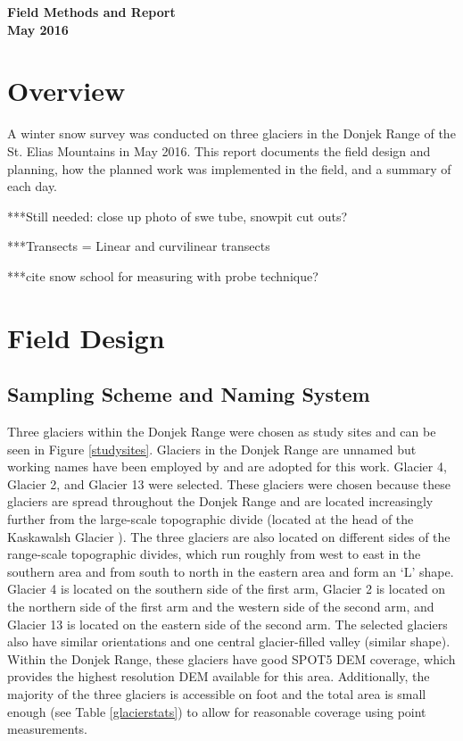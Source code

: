 \documentclass[12pt]{article}
\begin{document}

\begin{center}
\Large \textbf{Field Methods and Report \\ May 2016}
\end{center}


\section*{Overview}

A winter snow survey was conducted on three glaciers in the Donjek Range of the St. Elias Mountains in May 2016. This report documents the field design and planning, how the planned work was implemented in the field, and a summary of each day. 

***Still needed: close up photo of swe tube, snowpit cut outs?

***Transects = Linear and curvilinear transects

***cite snow school for measuring with probe technique?

\tableofcontents
\pagebreak

\section{Field Design}

\subsection{Sampling Scheme and Naming System}

Three glaciers within the Donjek Range were chosen as study sites and can be seen in Figure \ref{studysites}. Glaciers in the Donjek Range are unnamed but working names have been employed by \cite{Crompton2016} and are adopted for this work. Glacier 4, Glacier 2, and Glacier 13 were selected. These glaciers were chosen because these glaciers are spread throughout the Donjek Range and are located increasingly further from the large-scale topographic divide (located at the head of the Kaskawalsh Glacier \citep{Taylor1969}). The three glaciers are also located on different sides of the range-scale topographic divides, which run roughly from west to east in the southern area and from south to north in the eastern area and form an `L' shape. Glacier 4 is located on the southern side of the first arm, Glacier 2 is located on the northern side of the first arm and the western side of the second arm, and Glacier 13 is located on the eastern side of the second arm. The selected glaciers also have similar orientations and one central glacier-filled valley (similar shape). Within the Donjek Range, these glaciers have good SPOT5 DEM coverage, which provides the highest resolution DEM available for this area. Additionally, the majority of the three glaciers is accessible on foot and the total area is small enough (see Table \ref{glacierstats}) to allow for reasonable coverage using point measurements.
\end{document}

